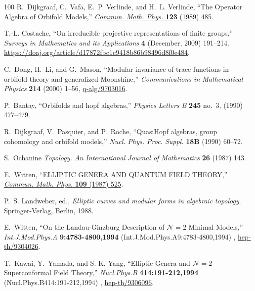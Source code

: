 \documentclass[11pt,a4paper,fontset=windows]{ctexart}
\numberwithin{equation}{section}
\begin{document}
\begin{thebibliography}{100}
R.~Dijkgraaf, C.~Vafa, E.~P. Verlinde, and H.~L. Verlinde, ``{The Operator
  Algebra of Orbifold Models},''
\href{http://dx.doi.org/10.1007/BF01238812}{{\em Commun. Math. Phys.}
  {\bfseries 123} (1989) 485}.

T.-L. Costache, ``On irreducible projective representations of finite groups,''
  {\em Surveys in Mathematics and its Applications} {\bfseries 4} (December,
  2009) 191--214.
  \url{https://doaj.org/article/d17872fbc1c9418b86b98496d8f0e484}.

C.~Dong, H.~Li, and G.~Mason, ``Modular invariance of trace functions in
  orbifold theory and generalized {M}oonshine,'' {\em Communications in
  Mathematical Physics} {\bfseries 214} (2000) 1--56,
  \href{http://arxiv.org/abs/q-alg/9703016}{{\ttfamily q-alg/9703016}}.

P.~Bantay, ``Orbifolds and hopf algebras,'' {\em Physics Letters B} {\bfseries
  245} no.~3, (1990) 477--479.

R.~Dijkgraaf, V.~Pasquier, and P.~Roche, ``{QuasiHopf algebras, group
  cohomology and orbifold models},''
{\em Nucl. Phys. Proc. Suppl.} {\bfseries 18B} (1990) 60--72.

S.~Ochanine {\em Topology. An International Journal of Mathematics} {\bfseries
  26} (1987) 143.

E.~Witten, ``{ELLIPTIC GENERA AND QUANTUM FIELD THEORY},''
\href{http://dx.doi.org/10.1007/BF01208956}{{\em Commun. Math. Phys.}
  {\bfseries 109} (1987) 525}.

P.~S. Landweber, ed., {\em {Elliptic curves and modular forms in algebraic
  topology}}.
\newblock Springer-Verlag, Berlin, 1988.

E.~Witten, ``{On the Landau-Ginzburg Description of $\mathcal{N}=2$ Minimal
  Models},'' {\em Int.J.Mod.Phys.A} {\bfseries 9:4783-4800,1994}
  (Int.J.Mod.Phys.A9:4783-4800,1994) ,
  \href{http://arxiv.org/abs/hep-th/9304026}{{\ttfamily hep-th/9304026}}.

T.~Kawai, Y.~Yamada, and S.-K. Yang, ``{Elliptic Genera and $\mathcal{N}=2$
  Superconformal Field Theory},'' {\em Nucl.Phys.B} {\bfseries
  414:191-212,1994} (Nucl.Phys.B414:191-212,1994) ,
  \href{http://arxiv.org/abs/hep-th/9306096}{{\ttfamily hep-th/9306096}}.


\end{thebibliography}
\end{document}
